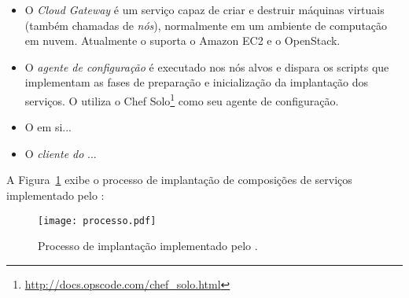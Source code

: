 \begin{itemize}

\item O \emph{Cloud Gateway} é um serviço capaz de criar e destruir máquinas virtuais (também chamadas de \emph{nós}), normalmente em um ambiente de computação em nuvem. Atualmente o \ee suporta o Amazon EC2 e o OpenStack.

\item O \emph{agente de configuração} é executado nos nós alvos
e dispara os scripts que implementam as fases de preparação
e inicialização da implantação dos serviços.
O \ee utiliza o Chef Solo\footnote{\url{http://docs.opscode.com/chef_solo.html}}
como seu agente de configuração.

\item O \emph{\ee} em si...

%
%
%

\item O \emph{cliente do \ee} ...

\end{itemize} 

A Figura~\ref{fig:processo} exibe o processo de implantação de composições
de serviços implementado pelo \ee:

\begin{figure}[ht]
\centering
\texttt{[image: processo.pdf]}
\caption{Processo de implantação implementado pelo \ee.}
\label{fig:processo}
\end{figure}

